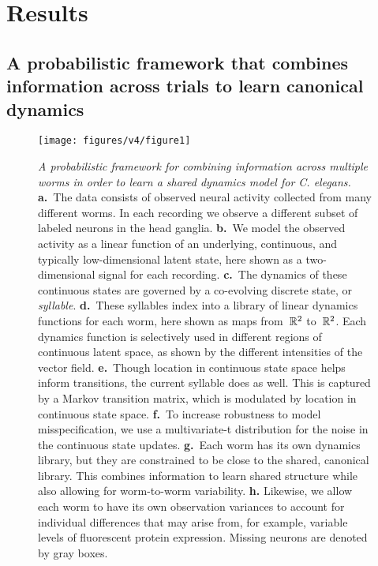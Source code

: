 \documentclass[11pt]{article}
\newcommand{\celegans}{\textit{C. elegans}}
\begin{document}
\clearpage

\section*{Results}

\subsection*{A probabilistic framework that combines information across
  trials to learn canonical dynamics}


\begin{figure}[t!]
\centering%
\texttt{[image: figures/v4/figure1]} 
\caption{
  \textit{A probabilistic framework for combining
  information across multiple worms in order to learn a shared
  dynamics model for \celegans.}
  \textbf{a.}~The data consists of observed neural activity collected
  from many different worms.  In each recording we observe a different
  subset of labeled neurons in the head ganglia.
  \textbf{b.}~We model the observed activity as a linear function of
  an underlying, continuous, and typically low-dimensional latent state,
  here shown as a two-dimensional signal for each recording.
  \textbf{c.}~The dynamics of these continuous states are governed by
  a co-evolving discrete state, or \emph{syllable}.
  \textbf{d.}~These syllables index into a library of linear
  dynamics functions for each worm, here shown as maps from~$\mathbb{R}^2$ to~$\mathbb{R}^2$.
  Each dynamics function is selectively used in different regions of
  continuous latent space, as shown by the different intensities of
  the vector field.
  \textbf{e.}~Though location in continuous state space helps inform
  transitions, the current syllable does as well. This is captured
  by a Markov transition matrix, which is modulated by location in
  continuous state space.
  \textbf{f.}~To increase robustness to model misspecification, we
  use a multivariate-t distribution for the noise in the continuous
  state updates.
  \textbf{g.}~Each worm has its own dynamics library, but they are
  constrained to be close to the shared, canonical library.  This
  combines information to learn shared structure while also allowing
  for worm-to-worm variability.
  \textbf{h.} Likewise, we allow each worm to have its own observation
  variances to account for individual differences that may arise from,
  for example, variable levels of fluorescent protein expression.
  Missing neurons are denoted by gray boxes. 
}
\label{fig:model}
\end{figure}
\end{document}

